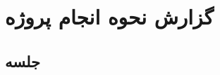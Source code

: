 \documentclass[12pt,a4paper]{article}
\begin{document}
\pagebreak

\section{گزارش نحوه انجام پروژه} \label{section.report}

\subsection{جلسه } \label{section.report.postMortem}


\subsection{} \label{section.report.taskBoard}


\subsection{} \label{section.report.burndownChart}
\end{document}
